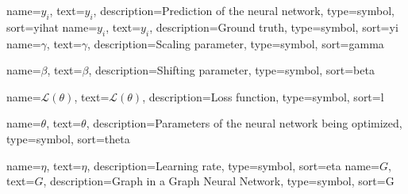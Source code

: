 {
  name={$\hat{y}_i$},
  text={\ensuremath{\hat{y}_i}},
  description={Prediction of the neural network},
  type=symbol,
  sort=yihat
}
{
  name={$y_i$},
  text={\ensuremath{y_i}},
  description={Ground truth},
  type=symbol,
  sort=yi
}
{
  name={$\gamma$},
  text={\ensuremath{\gamma}},
  description={Scaling parameter},
  type=symbol,
  sort=gamma
}

{
  name={$\beta$},
  text={\ensuremath{\beta}},
  description={Shifting parameter},
  type=symbol,
  sort=beta
}

{
  name={$\mathcal{L(\theta)}$},
  text={\ensuremath{\mathcal{L(\theta)}}},
  description={Loss function},
  type=symbol,
  sort=l
}

{
  name={$\theta$},
  text={\ensuremath{\theta}},
  description={Parameters of the neural network being optimized},
  type=symbol,
  sort=theta
}


{
  name={$\eta$},
  text={\ensuremath{\eta}},
  description={Learning rate},
  type=symbol,
  sort=eta
}
{
  name={$G$},
  text={\ensuremath{G}},
  description={Graph in a Graph Neural Network},
  type=symbol,
  sort=G
}

